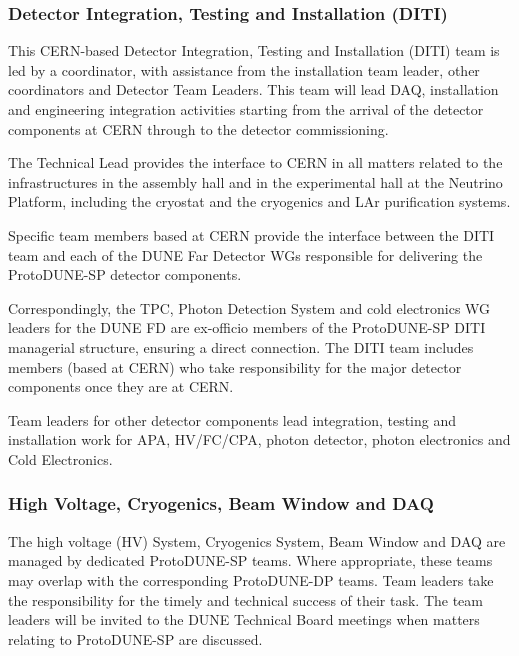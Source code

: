 
\subsubsection{Detector Integration, Testing and Installation (DITI)}

This CERN-based Detector Integration, Testing and Installation (DITI) team is led by a coordinator, with assistance from the installation team leader, other coordinators and Detector Team Leaders.  This team will lead DAQ, installation and engineering integration activities starting from the arrival of the detector components at CERN through to the detector commissioning.

The Technical Lead provides the interface to CERN in all matters related to the infrastructures in the assembly hall and in the experimental hall at the Neutrino Platform, including the cryostat and the cryogenics and LAr purification systems.

Specific team members based at CERN provide the interface between the DITI team and each of the DUNE Far Detector WGs responsible for delivering the ProtoDUNE-SP detector components. 

Correspondingly, the TPC, Photon Detection System and cold electronics WG leaders for the DUNE FD are ex-officio members of the ProtoDUNE-SP DITI managerial structure, ensuring a direct connection. The DITI team includes members (based at CERN) who take responsibility for the major detector components once they are at CERN.

Team leaders for other detector components lead integration, testing and installation work for APA, HV/FC/CPA, photon detector, photon electronics and Cold Electronics.


\subsubsection{High Voltage, Cryogenics, Beam Window and DAQ }

The high voltage (HV) System, Cryogenics System, Beam Window and DAQ are managed by dedicated ProtoDUNE-SP teams. Where appropriate, these teams may overlap with the corresponding ProtoDUNE-DP teams. Team leaders take the responsibility for the timely and technical success of their task. The team leaders will be invited to the DUNE Technical Board meetings when matters relating to ProtoDUNE-SP are discussed.

